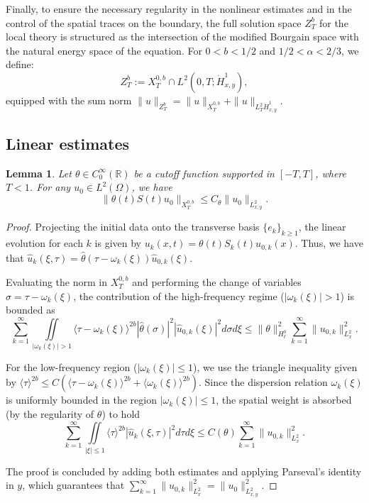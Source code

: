 \documentclass[11pt]{article}
\numberwithin{equation}{section}
\newtheorem{lemma}{Lemma}
\begin{document}
Finally, to ensure the necessary regularity in the nonlinear estimates and in the control of the spatial traces on the boundary, the full solution space $Z^b_T$ for the local theory is structured as the intersection of the modified Bourgain space with the natural energy space of the equation. For $0< b < 1/2$ and $1/2<\alpha <2/3$, we define:
\begin{equation}
Z^{b}_{T} := X^{0,b}_{T} \cap L^{2}(0,T; \dot{H}^{1}_{x,y}),\end{equation}
equipped with the sum norm $\|u\|_{Z^{b}_{T}} = \|u\|_{X^{0,b}_{T}} + \|u\|_{L^{2}_{T} \dot{H}^{1}_{x,y}}$.

\subsection{Linear estimates}\label{5.2}

\begin{lemma}
Let $\theta \in C_{0}^{\infty}(\mathbb{R})$ be a cutoff function supported in $[-T, T]$, where $T<1$. For any $u_{0}\in L^{2}(\Omega)$, we have
\begin{equation}
\|\theta(t)S(t)u_0\|_{X_{T}^{0,b}} \leq C_\theta \|u_0\|_{L^2_{x,y}}.
\end{equation}
\end{lemma}
\begin{proof}
Projecting the initial data onto the transverse basis $\{e_k\}_{k \ge 1}$, the linear evolution for each $k$ is given by $u_k(x,t) = \theta(t)S_k(t)u_{0,k}(x)$. Thus, we have that $\widehat{u}_k(\xi, \tau) = \widehat{\theta}(\tau - \omega_k(\xi)) \widehat{u}_{0,k}(\xi)$.

Evaluating the norm in $X_{T}^{0,b}$ and performing the change of variables $\sigma = \tau - \omega_k(\xi)$, the contribution of the high-frequency regime ($|\omega_{k}(\xi)| > 1$) is bounded as
\begin{equation}
\sum_{k=1}^{\infty} \underset{|\omega_{k}(\xi)| > 1}{\iint} \langle \tau - \omega_k(\xi) \rangle^{2b} |\widehat{\theta}(\sigma)|^2 |\widehat{u}_{0,k}(\xi)|^2 d\sigma d\xi \le \|\theta\|_{H^b_t}^2 \sum_{k=1}^{\infty} \|u_{0,k}\|_{L^2_x}^2.
\end{equation}

For the low-frequency region ($|\omega_{k}(\xi)| \le 1$), we use the triangle inequality given by $\langle \tau \rangle^{2b} \leq C\left(\langle \tau - \omega_k(\xi) \rangle^{2b} + \langle \omega_k(\xi) \rangle^{2b}\right)$. Since the dispersion relation $\omega_k(\xi)$ is uniformly bounded in the region $|\omega_{k}(\xi)| \le 1$, the spatial weight is absorbed (by the regularity of $\theta$) to hold
\begin{equation}
\sum_{k=1}^{\infty} \underset{|\xi| \le 1}{\iint} \langle \tau \rangle^{2b} |\widehat{u}_k(\xi,\tau)|^2 d\tau d\xi \le C(\theta) \sum_{k=1}^{\infty} \|u_{0,k}\|_{L^2_x}^2.
\end{equation}

The proof is concluded by adding both estimates and applying Parseval's identity in $y$, which guarantees that $\sum_{k=1}^{\infty} \|u_{0,k}\|_{L^2_x}^2 = \|u_0\|_{L^2_{x,y}}^2$.
\end{proof}
\end{document}
